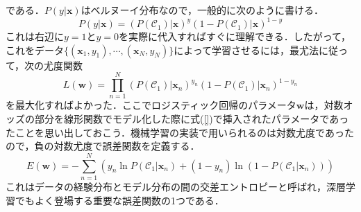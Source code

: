 \documentclass[a4paper,11pt]{jsreport}
\begin{document}
である．$P(y | \bm{x})$はベルヌーイ分布なので，一般的に次のように書ける．
\begin{equation}
  P(y|\bm{x})
  = \left( P(\mathcal{C}_1)|\bm{x} \right)^y \left( 1 - P(\mathcal{C}_1)|\bm{x} \right)^{1 - y}
\end{equation}
これは右辺に$y = 1$と$y = 0$を実際に代入すればすぐに理解できる．したがって，これをデータ$\{ (\bm{x}_1, y_1), \cdots, (\bm{x}_N, y_N) \}$によって学習させるには，最尤法に従って，次の尤度関数
\begin{equation}
  L(\bm{w}) 
  = \prod_{n=1}^N \left( P(\mathcal{C}_1)|\bm{x}_n \right)^{y_n} \left( 1 - P(\mathcal{C}_1)|\bm{x}_n \right)^{1 - y_n}
\end{equation}
を最大化すればよかった．ここでロジスティック回帰のパラメータ$\bm{w}$は，対数オッズの部分を線形関数でモデル化した際に式(\ref{})で挿入されたパラメータであったことを思い出しておこう．機械学習の実装で用いられるのは対数尤度であったので，負の対数尤度で誤差関数を定義する．
\begin{equation}
  E(\bm{w}) 
  = -\sum_{n=1}^{N} \left( y_n \ln{P(\mathcal{C}_1|\bm{x}_n)} + (1 - y_n)\ln{(1 - P(\mathcal{C}_1|\bm{x}_n))} \right)
\end{equation}
これはデータの経験分布とモデル分布の間の交差エントロピーと呼ばれ，深層学習でもよく登場する重要な誤差関数の1つである．
\end{document}
